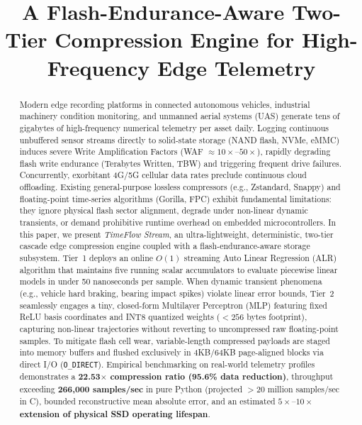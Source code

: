 \documentclass[journal]{IEEEtran}
\begin{document}
\title{A Flash-Endurance-Aware Two-Tier Compression Engine for High-Frequency Edge Telemetry}

\author{
}

\maketitle

\begin{abstract}
Modern edge recording platforms in connected autonomous vehicles, industrial machinery condition monitoring, and unmanned aerial systems (UAS) generate tens of gigabytes of high-frequency numerical telemetry per asset daily. Logging continuous unbuffered sensor streams directly to solid-state storage (NAND flash, NVMe, eMMC) induces severe Write Amplification Factors (WAF $\approx 10\times\text{--}50\times$), rapidly degrading flash write endurance (Terabytes Written, TBW) and triggering frequent drive failures. Concurrently, exorbitant 4G/5G cellular data rates preclude continuous cloud offloading. Existing general-purpose lossless compressors (e.g., Zstandard, Snappy) and floating-point time-series algorithms (Gorilla, FPC) exhibit fundamental limitations: they ignore physical flash sector alignment, degrade under non-linear dynamic transients, or demand prohibitive runtime overhead on embedded microcontrollers.
In this paper, we present \textit{TimeFlow Stream}, an ultra-lightweight, deterministic, two-tier cascade edge compression engine coupled with a flash-endurance-aware storage subsystem.
Tier~1 deploys an online $O(1)$ streaming Auto Linear Regression (ALR) algorithm that maintains five running scalar accumulators to evaluate piecewise linear models in under 50 nanoseconds per sample.
When dynamic transient phenomena (e.g., vehicle hard braking, bearing impact spikes) violate linear error bounds, Tier~2 seamlessly engages a tiny, closed-form Multilayer Perceptron (MLP) featuring fixed ReLU basis coordinates and INT8 quantized weights ($<256$ bytes footprint), capturing non-linear trajectories without reverting to uncompressed raw floating-point samples.
To mitigate flash cell wear, variable-length compressed payloads are staged into memory buffers and flushed exclusively in 4KB/64KB page-aligned blocks via direct I/O (\texttt{O\_DIRECT}).
Empirical benchmarking on real-world telemetry profiles demonstrates a \textbf{22.53$\times$ compression ratio (95.6\% data reduction)}, throughput exceeding \textbf{266,000 samples/sec} in pure Python (projected $>20$ million samples/sec in C), bounded reconstructive mean absolute error, and an estimated \textbf{$5\times\text{--}10\times$ extension of physical SSD operating lifespan}.
\end{abstract}
\end{document}
